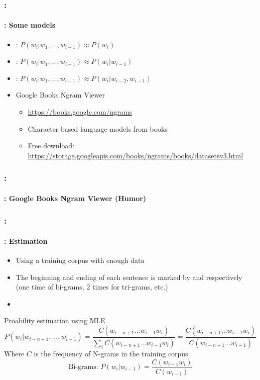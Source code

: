 \documentclass[xcolor=table]{beamer}
\begin{document}
\begin{frame}
	\frametitle{\insertshortsubtitle: \insertsection}
	\framesubtitle{\insertsubsection: Some models}

	\begin{itemize}
		\item {}: $P(w_i | w_1,\ldots, w_{i-1}) \approx P(w_i)$
		\item {}: $P(w_i | w_1,\ldots, w_{i-1}) \approx P(w_i | w_{i-1})$
		\item {}:  $P(w_i | w_1,\ldots, w_{i-1}) \approx P(w_i | w_{i-2}, w_{i-1})$
		\item Google Books Ngram Viewer
		\begin{itemize}
			\item \url{https://books.google.com/ngrams}
			\item Character-based language models from books 
			\item Free download: \url{https://storage.googleapis.com/books/ngrams/books/datasetsv3.html}
		\end{itemize}
	\end{itemize}

\end{frame}

\begin{frame}
	\frametitle{\insertshortsubtitle: \insertsection}
	\framesubtitle{\insertsubsection: Google Books Ngram Viewer (Humor)}

	\begin{center}
	\end{center}

\end{frame}

\begin{frame}
	\frametitle{\insertshortsubtitle: \insertsection}
	\framesubtitle{\insertsubsection: Estimation}

	\begin{itemize}
		\item Using a training corpus with enough data
		\item The beginning and ending of each sentence is marked by  and  respectively (one time of bi-grams, 2 times for tri-grams, etc.)
		\item {}
	\end{itemize}
	
	\begin{block}{Proability estimation using MLE}
		{\small \[%
		P(w_i | w_{i-n+1},\ldots, w_{i-1}) = \frac{C(w_{i-n+1} \ldots w_{i-1} w_i)}{\sum_i C(w_{i-n+1} \ldots w_{i-1} w_i)}
		= \frac{C(w_{i-n+1} \ldots w_{i-1} w_i)}{C(w_{i-n+1} \ldots w_{i-1})}
		\]}
		Where $C$ is the frequency of N-grams in the training corpus
		\[%
		\text{Bi-grams: } P(w_i | w_{i-1}) = \frac{C(w_{i-1} w_i)}{C(w_{i-1})}
		\]
	\end{block}

\end{frame}
\end{document}
